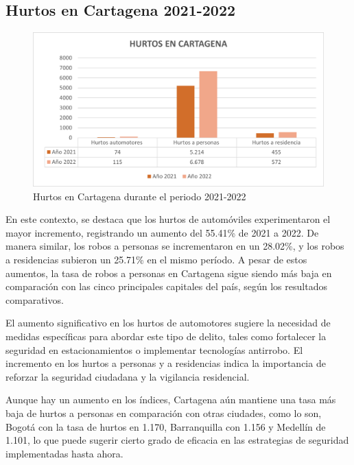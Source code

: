 \documentclass[letterpaper, 12pt]{article}
\begin{document}
\subsection*{Hurtos en Cartagena 2021-2022}

\begin{figure}[H]
    \begin{center}
        \includegraphics[width=.8\linewidth]{./Images/Graph.HurtosCartagena.png}
        \caption{Hurtos en Cartagena durante el periodo 2021-2022}
        \label{fig:Graph.HurtosCartagena}
    \end{center}
\end{figure}

En este contexto, se destaca que los hurtos de automóviles
experimentaron el mayor incremento, registrando un aumento
del 55.41\% de 2021 a 2022. De manera similar, los robos a
personas se incrementaron en un 28.02\%, y los robos a
residencias subieron un 25.71\% en el mismo período. A
pesar de estos aumentos, la tasa de robos a personas en
Cartagena sigue siendo más baja en comparación con las
cinco principales capitales del país, según los resultados
comparativos.

El aumento significativo en los hurtos de automotores
sugiere la necesidad de medidas específicas para abordar
este tipo de delito, tales como fortalecer la seguridad en
estacionamientos o implementar tecnologías antirrobo. El
incremento en los hurtos a personas y a residencias indica
la importancia de reforzar la seguridad ciudadana y la
vigilancia residencial.

Aunque hay un aumento en los índices, Cartagena aún
mantiene una tasa más baja de hurtos a personas en
comparación con otras ciudades, como lo son, Bogotá con la
tasa de hurtos en 1.170, Barranquilla con 1.156 y Medellín
de 1.101, lo que puede sugerir cierto grado de eficacia en
las estrategias de seguridad implementadas hasta ahora.

\newpage

\printbibliography
\end{document}

